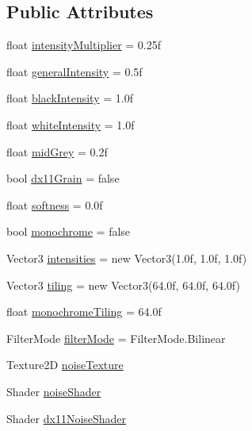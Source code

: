\subsection*{Public Attributes}
\begin{DoxyCompactItemize}
\item 
float \mbox{\hyperlink{class_unity_standard_assets_1_1_image_effects_1_1_noise_and_grain_aa605d8a0d636f3e18b03585eed9c34e8}{intensity\+Multiplier}} = 0.\+25f
\item 
float \mbox{\hyperlink{class_unity_standard_assets_1_1_image_effects_1_1_noise_and_grain_adb4c4f161db49a2c89a452cbad797ad6}{general\+Intensity}} = 0.\+5f
\item 
float \mbox{\hyperlink{class_unity_standard_assets_1_1_image_effects_1_1_noise_and_grain_a8b28abd24000bab6e15c43f9e2043c11}{black\+Intensity}} = 1.\+0f
\item 
float \mbox{\hyperlink{class_unity_standard_assets_1_1_image_effects_1_1_noise_and_grain_a8071907b73aa52eb1d93d9733ea67a0f}{white\+Intensity}} = 1.\+0f
\item 
float \mbox{\hyperlink{class_unity_standard_assets_1_1_image_effects_1_1_noise_and_grain_a99ebd1b729239dec9bf99e673784f999}{mid\+Grey}} = 0.\+2f
\item 
bool \mbox{\hyperlink{class_unity_standard_assets_1_1_image_effects_1_1_noise_and_grain_a65a66965b7b69e1cc301346a41e55690}{dx11\+Grain}} = false
\item 
float \mbox{\hyperlink{class_unity_standard_assets_1_1_image_effects_1_1_noise_and_grain_a00e81b10f650c9bb032939306fe1cd96}{softness}} = 0.\+0f
\item 
bool \mbox{\hyperlink{class_unity_standard_assets_1_1_image_effects_1_1_noise_and_grain_a4f7eedc89bdff8673acfacab6b6bd1d0}{monochrome}} = false
\item 
Vector3 \mbox{\hyperlink{class_unity_standard_assets_1_1_image_effects_1_1_noise_and_grain_a719422b9dfb35cfa98257ce10443b6bc}{intensities}} = new Vector3(1.\+0f, 1.\+0f, 1.\+0f)
\item 
Vector3 \mbox{\hyperlink{class_unity_standard_assets_1_1_image_effects_1_1_noise_and_grain_a2fc59d479b25c61a9ae889c36e4819eb}{tiling}} = new Vector3(64.\+0f, 64.\+0f, 64.\+0f)
\item 
float \mbox{\hyperlink{class_unity_standard_assets_1_1_image_effects_1_1_noise_and_grain_ac9af83871d41233816d7f3b7ea3b73c9}{monochrome\+Tiling}} = 64.\+0f
\item 
Filter\+Mode \mbox{\hyperlink{class_unity_standard_assets_1_1_image_effects_1_1_noise_and_grain_aaffb57f79ee52d5e9d2de128a72c72c4}{filter\+Mode}} = Filter\+Mode.\+Bilinear
\item 
Texture2D \mbox{\hyperlink{class_unity_standard_assets_1_1_image_effects_1_1_noise_and_grain_ad89c8621e64bd717b6c9a28612b0bca1}{noise\+Texture}}
\item 
Shader \mbox{\hyperlink{class_unity_standard_assets_1_1_image_effects_1_1_noise_and_grain_aadb111fa31cfe78f2e32f28f0fe6610e}{noise\+Shader}}
\item 
Shader \mbox{\hyperlink{class_unity_standard_assets_1_1_image_effects_1_1_noise_and_grain_a4b8cf5971dfa04b86804606091bd0499}{dx11\+Noise\+Shader}}
\end{DoxyCompactItemize}
